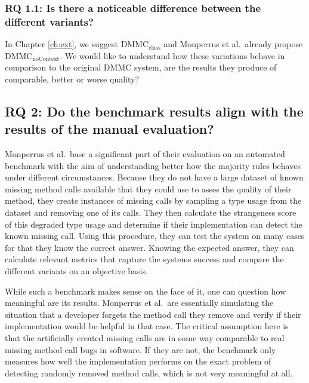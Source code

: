 \subsubsection{RQ 1.1: Is there a noticeable difference between the different variants?}

In Chapter \ref{ch:ext}, we suggest $\text{DMMC}_\text{class}$ and Monperrus et al.\ already propose $\text{DMMC}_\text{noContext}$.
We would like to understand how these variations behave in comparison to the original $\text{DMMC}$ system, are the results they produce of comparable, better or worse quality?

\subsection{RQ 2: Do the benchmark results align with the results of the manual evaluation?}

Monperrus et al.\ base a significant part of their evaluation on an automated benchmark with the aim of understanding better how the majority rules behaves under different circumstances.
Because they do not have a large dataset of known missing method calls available that they could use to asses the quality of their method, they create instances of missing calls by sampling a type usage from the dataset and removing one of its calls.
They then calculate the strangeness score of this degraded type usage and determine if their implementation can detect the known missing call.
Using this procedure, they can test the system on many cases for that they know the correct answer.
Knowing the expected answer, they can calculate relevant metrics that capture the systems success and compare the different variants on an objective basis.

While such a benchmark makes sense on the face of it, one can question how meaningful are its results.
Monperrus et al.\ are essentially simulating the situation that a developer forgets the method call they remove and verify if their implementation would be helpful in that case.
The critical assumption here is that the artificially created missing calls are in some way comparable to real missing method call bugs in software.
If they are not, the benchmark only measures how well the implementation performs on the exact problem of detecting randomly removed method calls, which is not very meaningful at all.

